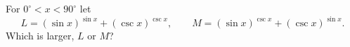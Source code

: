 For $0^\circ<x<90^\circ$ let
\[
L=(\sin x)^{\sin x}+(\csc x)^{\csc x},\qquad M=(\sin x)^{\csc x}+(\csc x)^{\sin x}.
\]
Which is larger, $L$ or $M$?
